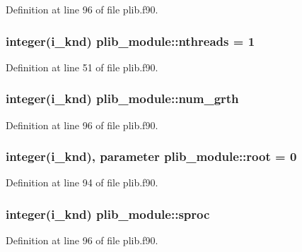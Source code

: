 Definition at line 96 of file plib.\-f90.

\hypertarget{classplib__module_aac4e1911c67e39262528b4ebf471997d}{
\subsubsection[{nthreads}]{\setlength{\rightskip}{0pt plus 5cm}integer(i\-\_\-knd) plib\-\_\-module\-::nthreads = 1}}\label{classplib__module_aac4e1911c67e39262528b4ebf471997d}


Definition at line 51 of file plib.\-f90.

\hypertarget{classplib__module_a8238cefc81a445bee3e137bb94f75e91}{
\subsubsection[{num\-\_\-grth}]{\setlength{\rightskip}{0pt plus 5cm}integer(i\-\_\-knd) plib\-\_\-module\-::num\-\_\-grth}}\label{classplib__module_a8238cefc81a445bee3e137bb94f75e91}


Definition at line 96 of file plib.\-f90.

\hypertarget{classplib__module_a4216863984e9df981d4a2d5a51020ce5}{
\subsubsection[{root}]{\setlength{\rightskip}{0pt plus 5cm}integer(i\-\_\-knd), parameter plib\-\_\-module\-::root = 0}}\label{classplib__module_a4216863984e9df981d4a2d5a51020ce5}


Definition at line 94 of file plib.\-f90.

\hypertarget{classplib__module_aa3b6e5883dfa628f71771e9e6ee3e722}{
\subsubsection[{sproc}]{\setlength{\rightskip}{0pt plus 5cm}integer(i\-\_\-knd) plib\-\_\-module\-::sproc}}\label{classplib__module_aa3b6e5883dfa628f71771e9e6ee3e722}


Definition at line 96 of file plib.\-f90.

